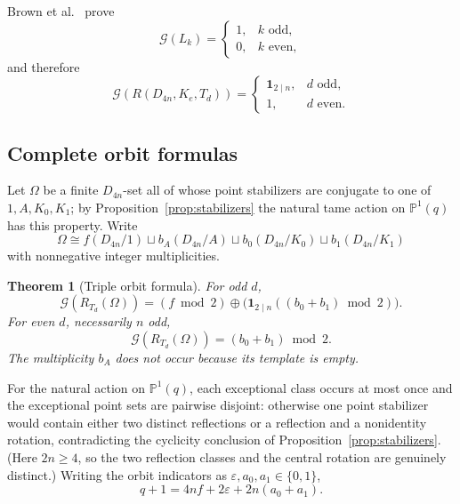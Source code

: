 \documentclass[11pt]{article}
\newtheorem{theorem}{Theorem}[section]
\theoremstyle{definition}
\theoremstyle{remark}
\newcommand{\PP}{\mathbb{P}}
\newcommand{\Grundy}{\mathcal{G}}
\begin{document}
Brown et al.\ \cite{BrownEtAl2020} prove
\begin{equation}
  \Grundy(L_k)=
  \begin{cases}
    1, & k\text{ odd},\\
    0, & k\text{ even},
  \end{cases}
  \label{eq:ladder-value}
\end{equation}
and therefore
\begin{equation}
  \Grundy(R(D_{4n},K_e,T_d))=
  \begin{cases}
    \mathbf 1_{2\mid n}, & d\text{ odd},\\
    1, & d\text{ even}.
  \end{cases}
  \label{eq:refl-value}
\end{equation}

\subsection{Complete orbit formulas}

Let $\Omega$ be a finite $D_{4n}$-set all of whose point stabilizers are conjugate to one of
$1,A,K_0,K_1$; by Proposition~\ref{prop:stabilizers} the natural tame action on $\PP^1(q)$ has this
property. Write
\begin{equation}
  \Omega\cong f(D_{4n}/1)\sqcup b_A(D_{4n}/A)\sqcup b_0(D_{4n}/K_0)\sqcup b_1(D_{4n}/K_1)
  \label{eq:multiplicities}
\end{equation}
with nonnegative integer multiplicities.

\begin{theorem}[Triple orbit formula]
\label{thm:triple-orbit}
For odd $d$,
\begin{equation}
  \Grundy(R_{T_d}(\Omega))=(f\bmod2)\oplus\bigl(\mathbf 1_{2\mid n}((b_0+b_1)\bmod2)\bigr).
  \label{eq:triple-odd}
\end{equation}
For even $d$, necessarily $n$ odd,
\begin{equation}
  \Grundy(R_{T_d}(\Omega))=(b_0+b_1)\bmod2 .
  \label{eq:triple-even}
\end{equation}
The multiplicity $b_A$ does not occur because its template is empty.
\end{theorem}

For the natural action on $\PP^1(q)$, each exceptional class occurs at most once and the exceptional
point sets are pairwise disjoint: otherwise one point stabilizer would contain either two distinct
reflections or a reflection and a nonidentity rotation, contradicting the cyclicity conclusion of
Proposition~\ref{prop:stabilizers}. (Here $2n\ge4$, so the two reflection classes and the central
rotation are genuinely distinct.) Writing the orbit indicators as
$\varepsilon,a_0,a_1\in\{0,1\}$,
\begin{equation}
  q+1=4nf+2\varepsilon+2n(a_0+a_1).
  \label{eq:orbit-equation}
\end{equation}
\end{document}
